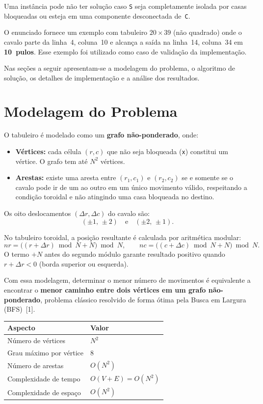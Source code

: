 \documentclass[12pt]{article}
\begin{document}
Uma instância pode não ter solução caso \texttt{S} seja completamente isolada por
casas bloqueadas ou esteja em uma componente desconectada de~\texttt{C}.

O enunciado fornece um exemplo com tabuleiro $20 \times 39$ (não quadrado) onde o
cavalo parte da linha~4, coluna~10 e alcança a saída na linha~14, coluna~34 em
\textbf{10~pulos}. Esse exemplo foi utilizado como caso de validação da implementação.

Nas seções a seguir apresentam-se a modelagem do problema, o algoritmo de solução,
os detalhes de implementação e a análise dos resultados.

\newpage

\section*{Modelagem do Problema}

O tabuleiro é modelado como um \textbf{grafo não-ponderado}, onde:

\begin{itemize}[leftmargin=2.2em,itemsep=0.4em]
  \item \textbf{Vértices:} cada célula $(r,c)$ que não seja bloqueada (\texttt{x})
        constitui um vértice. O grafo tem até $N^2$ vértices.
  \item \textbf{Arestas:} existe uma aresta entre $(r_1,c_1)$ e $(r_2,c_2)$ se e
        somente se o cavalo pode ir de um ao outro em um único movimento válido,
        respeitando a condição toroidal e não atingindo uma casa bloqueada no destino.
\end{itemize}

Os oito deslocamentos $(\Delta r, \Delta c)$ do cavalo são:
\[
  (\pm 1,\,\pm 2) \quad \text{e} \quad (\pm 2,\,\pm 1).
\]

No tabuleiro toroidal, a posição resultante é calculada por aritmética modular:
\[
  nr = \bigl((r + \Delta r) \bmod N + N\bigr) \bmod N,
  \qquad
  nc = \bigl((c + \Delta c) \bmod N + N\bigr) \bmod N.
\]
O termo $+N$ antes do segundo módulo garante resultado positivo quando
$r + \Delta r < 0$ (borda superior ou esquerda).

Com essa modelagem, determinar o menor número de movimentos é equivalente a encontrar
o \textbf{menor caminho entre dois vértices em um grafo não-ponderado}, problema clássico
resolvido de forma ótima pela Busca em Largura (BFS)~[1].

\vspace{0.6em}
\begin{center}
\renewcommand{\arraystretch}{1.3}
\begin{tabular}{ll}
\toprule
\textbf{Aspecto} & \textbf{Valor} \\
\midrule
Número de vértices      & $N^2$ \\
Grau máximo por vértice & 8 \\
Número de arestas       & $O(N^2)$ \\
Complexidade de tempo   & $O(V+E) = O(N^2)$ \\
Complexidade de espaço  & $O(N^2)$ \\
\bottomrule
\end{tabular}
\end{center}
\end{document}
